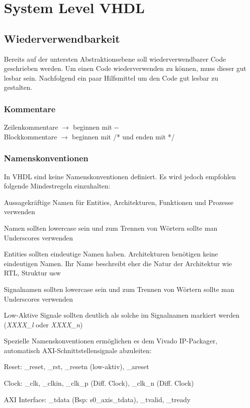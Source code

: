 \section{System Level VHDL}
\subsection{Wiederverwendbarkeit}
Bereits auf der untersten Abstraktionsebene soll wiederverwendbarer Code geschrieben werden. Um einen Code wiederverwenden zu können, muss dieser gut lesbar sein. Nachfolgend ein paar Hilfsmittel um den Code gut lesbar zu gestalten.
\subsubsection{Kommentare}
Zeilenkommentare $\rightarrow$ beginnen mit -{}-\\
Blockkommentare $\rightarrow$ beginnen mit /* und enden mit */
\subsubsection{Namenskonventionen}
In VHDL sind keine Namenskonventionen definiert. Es wird jedoch empfohlen folgende Mindestregeln einzuhalten:
\begin{compactitem}
    \item Aussagekräftige Namen für Entities, Architekturen, Funktionen und Prozesse verwenden
    \item Namen sollten lowercase sein und zum Trennen von Wörtern sollte man Underscores verwenden
    \item Entities sollten eindeutige Namen haben. Architekturen benötigen keine eindeutigen Namen. Ihr Name beschreibt eher die Natur der Architektur wie RTL, Struktur usw
    \item Signalnamen sollten lowercase sein und zum Trennen von Wörtern sollte man Underscores verwenden
    \item Low-Aktive Signale sollten deutlich als solche im Signalnamen markiert werden (\textit{XXXX\_l} oder \textit{XXXX\_n})
\end{compactitem}
Spezielle Namenskonventionen ermöglichen es dem Vivado IP-Packager, automatisch AXI-Schnittstellensignale abzuleiten:
\begin{compactitem}
    \item Reset: \_reset, \_rst, \_resetn (low-aktiv), \_areset
    \item Clock: \_clk, \_clkin, \_clk\_p (Diff. Clock), \_clk\_n (Diff. Clock)
    \item AXI Interface: \_tdata (Bsp: s0\_axis\_tdata), \_tvalid, \_tready
\end{compactitem}
